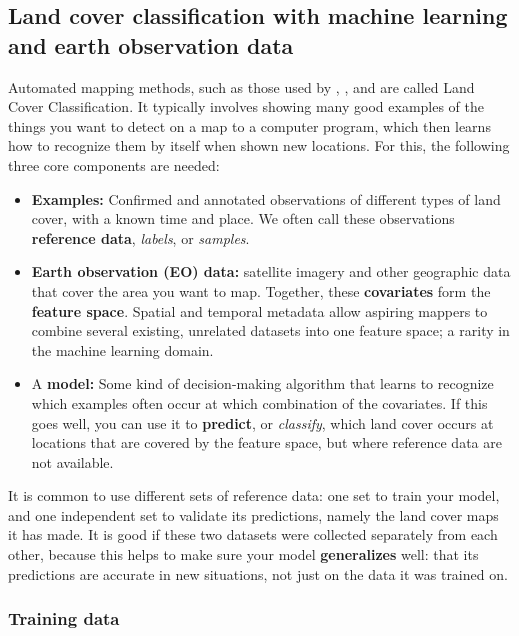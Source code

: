 \subsection{Land cover classification with machine learning and earth observation data}
    
    Automated mapping methods, such as those used by \citet{pflugmacher2019mapping}, \citet{dandrimont2021parcel}, \citet{luo2022developing} and \citet{malinowski2020automated} are called Land Cover Classification. It typically involves showing many good examples of the things you want to detect on a map to a computer program, which then learns how to recognize them by itself when shown new locations. For this, the following three core components are needed:
    
    \begin{itemize}
    \item \textbf{Examples:} Confirmed and annotated observations of different types of land cover, with a known time and place. We often call these observations \textbf{reference data}, \textit{labels}, or \textit{samples}.
    \item \textbf{Earth observation (EO) data:} satellite imagery and other geographic data that cover the area you want to map. Together, these \textbf{covariates} form the \textbf{feature space}. Spatial and temporal metadata allow aspiring mappers to combine several existing, unrelated datasets into one feature space; a rarity in the machine learning domain.
    \item A \textbf{model:} Some kind of decision-making algorithm that learns to recognize which examples often occur at which combination of the covariates. If this goes well, you can use it to \textbf{predict}, or \textit{classify}, which land cover occurs at locations that are covered by the feature space, but where reference data are not available.
    \end{itemize}
    
    It is common to use different sets of reference data: one set to train your model, and one independent set to validate its predictions, namely the land cover maps it has made. It is good if these two datasets were collected separately from each other, because this helps to make sure your model \textbf{generalizes} well: that its predictions are accurate in new situations, not just on the data it was trained on.

    \subsubsection{Training data}

